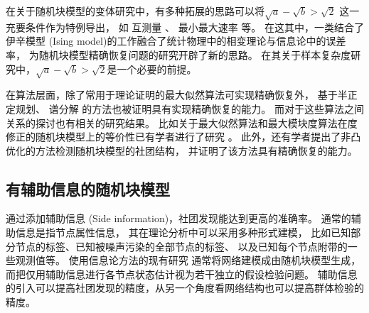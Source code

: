 在关于随机块模型的变体研究中，有多种拓展的思路可以将$\sqrt{a} - \sqrt{b} > \sqrt{2}$
这一充要条件作为特例导出，
如 互测量 \cite{chen2016information}、 最小最大速率 \cite{zhang2016} 等。
在这其中，一类结合了伊辛模型 (Ising model)的工作融合了统计物理中的相变理论与信息论中的误差率\cite{ye2020exact}，
为随机块模型精确恢复问题的研究开辟了新的思路。
在其关于样本复杂度研究中，$\sqrt{a} - \sqrt{b} > \sqrt{2}$是一个必要的前提。



在算法层面，除了常用于理论证明的最大似然算法可实现精确恢复外，
基于半正定规划\cite{hajek2016achieving,amini2018semidefinite}、
谱分解\cite{Yun2014} 的方法也被证明具有实现精确恢复的能力。
而对于这些算法之间关系的探讨也有相关的研究结果。
比如关于最大似然算法和最大模块度算法在度修正的随机块模型上的等价性已有学者进行了研究 \cite{newman2016equivalence}。
此外，还有学者提出了非凸优化的方法检测随机块模型的社团结构，
并证明了该方法具有精确恢复的能力\cite{wang2021non}。




\subsection{有辅助信息的随机块模型}
通过添加辅助信息 (Side information)，社团发现能达到更高的准确率。
通常的辅助信息是指节点属性信息\cite{he2019attribute}，
其在理论分析中可以采用多种形式建模，
比如已知部分节点的标签、已知被噪声污染的全部节点的标签、
以及已知每个节点附带的一些观测值等\cite{saad2018community}。
使用信息论方法的现有研究
通常将网络建模成由随机块模型生成，而把仅用辅助信息进行各节点状态估计视为若干独立的假设检验问题\cite{ahn2023testing}。
辅助信息的引入可以提高社团发现的精度，从另一个角度看网络结构也可以提高群体检验的精度。

